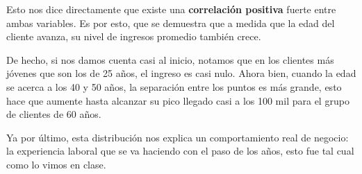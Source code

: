 \documentclass[letterpaper,11pt]{article}
\begin{document}
Esto nos dice directamente que existe una 
\textbf{correlación positiva} 
fuerte entre ambas variables. 
Es por esto, que se demuestra 
que a medida que la edad del cliente avanza, 
su nivel de ingresos promedio también crece. 

De hecho, si nos damos cuenta casi al inicio, 
notamos que en los clientes más jóvenes que son los de 25 años, 
el ingreso es casi nulo. 
Ahora bien, cuando la edad se acerca a los 40 y 50 años, 
la separación entre los puntos es más grande, 
esto hace que aumente hasta alcanzar su pico llegado casi a los 
100 mil para el grupo de clientes de 60 años.

Ya por último, esta distribución nos explica 
un comportamiento real de negocio: 
la experiencia laboral que se va haciendo
con el paso de los años, esto fue tal cual 
como lo vimos en clase.

\end{document}
